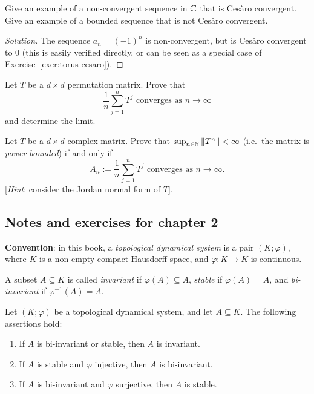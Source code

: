 \begin{exercise}
	Give an example of a non-convergent sequence in $\mathbb{C}$ that is Ces\`{a}ro convergent. Give an example of a bounded sequence that is not Ces\`{a}ro convergent.
\end{exercise}

\begin{proof}[Solution]
	The sequence $a_n = (-1)^n$ is non-convergent, but is Ces\`{a}ro convergent to 0 (this is easily verified directly, or can be seen as a special case of Exercise~\ref{exer:torus-cesaro}).
\end{proof}

\begin{exercise}
	Let $T$ be a $d\times d$ permutation matrix. Prove that
	\begin{equation*}
		\frac{1}{n}\sum_{j=1}^n T^j \text{ converges as } n \to \infty
	\end{equation*}
	and determine the limit.
\end{exercise}

\begin{exercise}
	Let $T$ be a $d\times d$ complex matrix. Prove that $\sup_{n\in\mathbb{N}} \|T^n\| < \infty$ (i.e.\ the matrix is \emph{power-bounded}) if and only if
	\begin{equation*}
		A_n := \frac{1}{n}\sum_{j=1}^n T^j \text{ converges as } n\to\infty.
	\end{equation*}
	[\emph{Hint}: consider the Jordan normal form of $T$].
\end{exercise}

\subsection{Notes and exercises for chapter 2}
\textbf{Convention}: in this book, a \emph{topological dynamical system} is a pair $(K;\varphi)$, where $K$ is a non-empty compact Hausdorff space, and $\varphi : K \to K$ is continuous.

\begin{definition}
	A subset $A \subseteq K$ is called \emph{invariant} if $\varphi(A) \subseteq A$, \emph{stable} if $\varphi(A) = A$, and \emph{bi-invariant} if $\varphi^{-1}(A) = A$.
\end{definition}

\begin{lemma}[Exercise 2.9]
	Let $(K;\varphi)$ be a topological dynamical system, and let $A \subseteq K$. The following assertions hold:
	\begin{enumerate}[\upshape (i)]
		\item If $A$ is bi-invariant or stable, then $A$ is invariant.
		\item If $A$ is stable and $\varphi$ injective, then $A$ is bi-invariant.
		\item If $A$ is bi-invariant and $\varphi$ surjective, then $A$ is stable.
	\end{enumerate}
\end{lemma}

